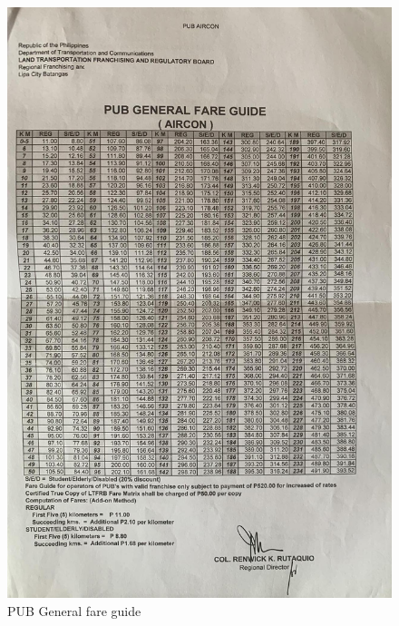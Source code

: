 \documentclass[journal]{./IEEE/IEEEtran}
\begin{document}
\section{}
\begin{figure}[!h]
    \centering
        \includegraphics[scale=0.14]{./figures/ltfrb/pub.jpeg}
    \caption{PUB General fare guide}
\end{figure}
\end{document}
